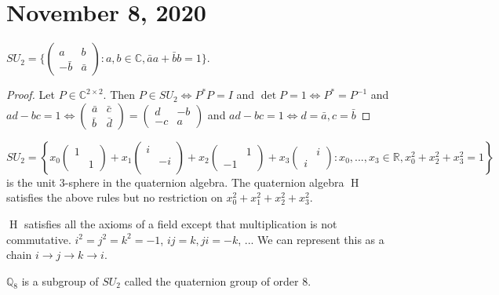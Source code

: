 \documentclass{article}
\newcommand{\C}{\mathbb{C}}
\newcommand{\Q}{\mathbb{Q}}
\newcommand{\R}{\mathbb{R}}
\newcommand{\HH}{{\operatorname{H}}}
\newcommand{\ra}[1][]{\xrightarrow{#1}}
\begin{document}
\section{November 8, 2020}
\begin{proposition}
$SU_2=\{\begin{pmatrix}
a & b \\
-\bar{b} & \bar{a}
\end{pmatrix}:a,b\in\C, \bar{a}a+\bar{b}b=1\}$.
\end{proposition}
\begin{proof}
Let $P\in \C^{2\times 2}$. Then $P\in SU_2 \iff P^*P=I$ and $\det P=1\iff P^*=P^{-1}$ and $ad-bc=1\iff \begin{pmatrix}
\bar{a} & \bar{c} \\
\bar{b} & \bar{d}
\end{pmatrix}=\begin{pmatrix}
d&-b\\
-c&a
\end{pmatrix}$ and $ad-bc=1\iff d=\bar{a},c=\bar b$
\end{proof}
\begin{corollary}
$SU_2=\left\{x_0\begin{pmatrix}
1&\\
&1
\end{pmatrix}+x_1\begin{pmatrix}
i&\\&-i\\
\end{pmatrix}+x_2\begin{pmatrix}
&1\\-1&
\end{pmatrix}+x_3\begin{pmatrix}
&i\\i&
\end{pmatrix}:x_0,...,x_3\in\R, x_0^2+x_2^2+x_3^2=1\right\}$
is the unit 3-sphere in the quaternion algebra. The quaternion algebra $\HH$ satisfies the above rules but no restriction on $x_0^2+x_1^2+x_2^2+x_3^2$.
\end{corollary}
\begin{fact}
$\HH$ satisfies all the axioms of a field except that multiplication is not commutative. $i^2=j^2=k^2=-1$, $ij=k, ji=-k$, ... We can represent this as a chain $i\ra j\ra k \ra i$.
\end{fact}
\begin{definition}
$\Q_8$ is a subgroup of $SU_2$ called the quaternion group of order 8.
\end{definition}
\end{document}
